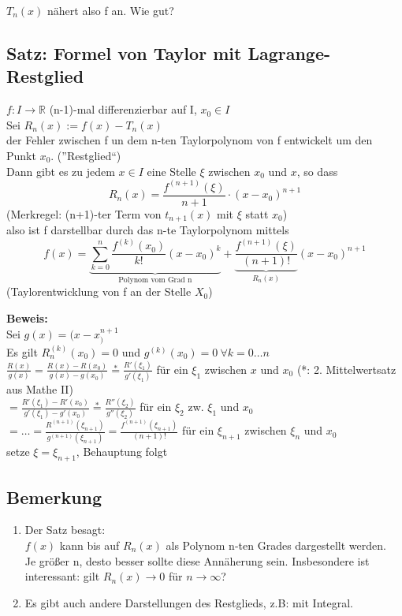 $T_n(x)$ nähert also f an. Wie gut?

\subsection{Satz: Formel von Taylor mit Lagrange-Restglied}
$f:I\rightarrow \mathbb{R}$ (n-1)-mal differenzierbar auf I, $x_0\in I$\\
Sei $R_n(x):=f(x)-T_n(x)$\\
der Fehler zwischen f un dem n-ten Taylorpolynom von f entwickelt um den Punkt $x_0$. (''Restglied``)\\
Dann gibt es zu jedem $x\in I$ eine Stelle $\xi$ zwischen $x_0$ und $x$, so dass \[R_n(x)=\frac{f^{(n+1)}(\xi)}{n+1}\cdot (x-x_0)^{n+1}\]
(Merkregel: (n+1)-ter Term von $t_{n+1}(x)$ mit $\xi$ statt $x_0$)\\
also ist f darstellbar durch das n-te Taylorpolynom mittels \[f(x)=\underbrace{\sum_{k=0}^n \frac{f^{(k)}(x_0)}{k!}(x-x_0)^k}_{\text{Polynom vom Grad n}} + \underbrace{\frac{f^{(n+1)}(\xi)}{(n+1)!}}_{R_n(x)}(x-x_0)^{n+1}\]
(Taylorentwicklung von f an der Stelle $X_0$)

\textbf{Beweis:}\\
Sei $g(x)=(x-x_)^{n+1}$\\
Es gilt $R_n^{(k)}(x_0)=0$ und $g^{(k)}(x_0)=0 \ \forall k=0\dots n$\\
$\frac{R(x)}{g(x)}=\frac{R(x)-R(x_0)}{g(x)-g(x_0)} \stackrel{*}{=} \frac{R'(\xi_1)}{g'(\xi_1)}$ für ein $\xi_1$ zwischen $x$ und $x_0$ (*: 2. Mittelwertsatz aus Mathe II)\\
$=\frac{R'(\xi_1)-R'(x_0)}{g'(\xi_1)-g'(x_0)} \stackrel{*}{=} \frac{R''(\xi_2)}{g''(\xi_2)}$ für ein $\xi_2$ zw. $\xi_1$ und $x_0$\\
$=\dots = \frac{R^{(n+1)}(\xi_{n+1})}{g^{(n+1)}(\xi_{n+1})} = \frac{f^{(n+1)}(\xi_{n+1})}{(n+1)!}$ für ein $\xi_{n+1}$ zwischen $\xi_n$ und $x_0$\\
setze $\xi=\xi_{n+1}$, Behauptung folgt

\subsection{Bemerkung}
\begin{enumerate}
	\item
	Der Satz besagt:\\
	$f(x)$ kann bis auf $R_n(x)$ als Polynom n-ten Grades dargestellt werden.\\
	Je größer n, desto besser sollte diese Annäherung sein. Insbesondere ist interessant: gilt $R_n(x)\rightarrow 0$ für $n\rightarrow \infty$?
	
	\item
	Es gibt auch andere Darstellungen des Restglieds, z.B: mit Integral.
\end{enumerate}

